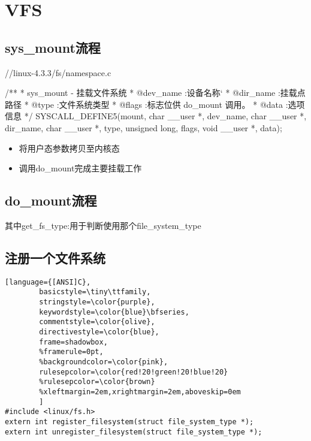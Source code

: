 \chapter{VFS}



\section{sys\_mount流程}


\begin{code}
//linux-4.3.3/fs/namespace.c

/**
 * sys_mount - 挂载文件系统
 * @dev_name :设备名称`
 * @dir_name :挂载点路径
 * @type :文件系统类型
 * @flags :标志位供 do_mount 调用。
 * @data :选项信息
 */
SYSCALL_DEFINE5(mount, char __user *, dev_name, char __user *, dir_name,
		char __user *, type, unsigned long, flags, void __user *, data);
\end{code}

\begin{itemize}
\item 将用户态参数拷贝至内核态
\item 调用do\_mount完成主要挂载工作
\end{itemize}

\section{do\_mount流程}


其中get\_fs\_type:用于判断使用那个file\_system\_type

\section{注册一个文件系统}



\begin{lstlisting}[language={[ANSI]C},
        basicstyle=\tiny\ttfamily,
        stringstyle=\color{purple},
        keywordstyle=\color{blue}\bfseries,
        commentstyle=\color{olive},
        directivestyle=\color{blue},
        frame=shadowbox,
        %framerule=0pt,
        %backgroundcolor=\color{pink},
        rulesepcolor=\color{red!20!green!20!blue!20}
        %rulesepcolor=\color{brown}
        %xleftmargin=2em,xrightmargin=2em,aboveskip=0em
        ]
#include <linux/fs.h>
extern int register_filesystem(struct file_system_type *);
extern int unregister_filesystem(struct file_system_type *);
\end{lstlisting}


